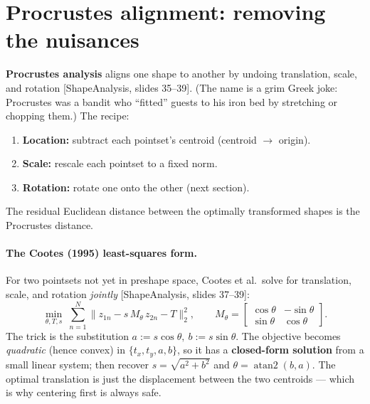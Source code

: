 \documentclass[11pt]{article}
\newcommand{\deck}[1]{\textsf{\small[#1]}}
\begin{document}
\section{Procrustes alignment: removing the nuisances}

\textbf{Procrustes analysis} aligns one shape to another by undoing translation,
scale, and rotation \deck{ShapeAnalysis, slides 35--39}. (The name is a grim
Greek joke: Procrustes was a bandit who ``fitted'' guests to his iron bed by
stretching or chopping them.) The recipe:
\begin{enumerate}[nosep,leftmargin=*]
  \item \textbf{Location:} subtract each pointset's centroid (centroid $\to$ origin).
  \item \textbf{Scale:} rescale each pointset to a fixed norm.
  \item \textbf{Rotation:} rotate one onto the other (next section).
\end{enumerate}
The residual Euclidean distance between the optimally transformed shapes is the
Procrustes distance.

\paragraph{The Cootes (1995) least-squares form.} For two pointsets not yet in
preshape space, Cootes et al.\ solve for translation, scale, and rotation
\emph{jointly} \deck{ShapeAnalysis, slides 37--39}:
\[
\min_{\theta,T,s}\;\sum_{n=1}^{N}\big\| z_{1n} - s\,M_\theta\,z_{2n} - T \big\|_2^2,
\qquad
M_\theta = \begin{bmatrix}\cos\theta & -\sin\theta\\ \sin\theta & \cos\theta\end{bmatrix}.
\]
The trick is the substitution $a := s\cos\theta,\ b:=s\sin\theta$. The objective
becomes \emph{quadratic} (hence convex) in $\{t_x,t_y,a,b\}$, so it has a
\textbf{closed-form solution} from a small linear system; then recover
$s=\sqrt{a^2+b^2}$ and $\theta=\operatorname{atan2}(b,a)$. The optimal
translation is just the displacement between the two centroids --- which is why
centering first is always safe.
\end{document}
